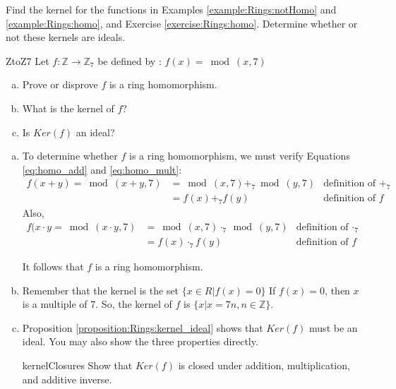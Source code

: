 \begin{exercise}{}
Find the kernel for the functions in Examples \ref{example:Rings:notHomo} and \ref{example:Rings:homo}, and Exercise \ref{exercise:Rings:homo}.  Determine whether or not these kernels are ideals.
\end{exercise}

\begin{example}{ZtoZ7}
Let $f:{\mathbb Z}\rightarrow {\mathbb Z}_7$ be defined by : $f(x)=\bmod(x,7)$
\begin{enumerate}[(a)]
\item Prove or disprove $f$ is a ring homomorphism.
\item What is the kernel of $f$?
\item Is $Ker(f)$ an ideal?
\end{enumerate}

\begin{enumerate}[(a)]
\item To determine whether $f$ is a ring homomorphism, we must verify Equations \eqref{eq:homo_add} and \eqref{eq:homo_mult}:\\
\begin{align*}
f(x+y)=\bmod(x+y,7)&=\bmod(x,7)+_7\bmod(y,7) & \text{definition of $+_7$}\\
&=f(x)+_7 f(y) & \text{definition of $f$} 
\end{align*}
Also,
\begin{align*}
f(x\cdot y=\bmod(x\cdot y,7)&=\bmod(x,7)\cdot_7\bmod(y,7) & \text{definition of $\cdot_7$}\\
&=f(x)\cdot_7f(y) & \text{definition of $f$}
\end{align*}

It follows that $f$ is a ring homomorphism.

\item Remember that the kernel is the set $\{x\in R|f(x)=0\}$ If $f(x)=0$, then $x$ is a multiple of 7. So, the kernel of $f$ is $\{x|x=7n, n\in{\mathbb Z}\}$.

\item Proposition \ref{proposition:Rings:kernel_ideal} shows that $Ker(f)$ must be an ideal.  You may also show the three properties directly.

\begin{exercise}{kernelClosures}
Show that $Ker(f)$ is closed under addition, multiplication, and additive inverse.
\end{exercise}
\end{enumerate}
\end{example}


